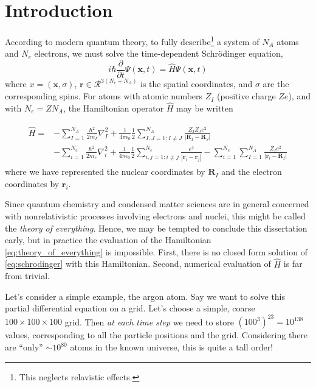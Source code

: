 \chapter{Introduction}
\label{chap:intro}

According to modern quantum theory, to fully describe\footnote{This neglects relavistic effects.} a system of $N_A$ atoms and $N_e$ electrons, we must solve the time-dependent Schr\"odinger equation,
\begin{equation}
    \label{eq:schrodinger}
    i \hbar \frac{\partial}{\partial t} \Psi(\bm{x}, t)
    = \hat{H} \Psi(\bm{x}, t)
\end{equation}
where $x=(\bm{x}, \sigma)$, $\bm r\in\mathcal{R}^{3(N_e+N_A)}$ is the spatial coordinates, and $\sigma$ are the corresponding spins. For atoms with atomic numbers $Z_I$ (positive charge $Ze$), and with $N_e=ZN_A$, the Hamiltonian operator $\hat H$ may be written

\begin{align}
\begin{split}
\label{eq:theory_of_everything}
\hat H =& -\sum_{I=1}^{N_A}\frac{\hbar^2}{2m_I} \nabla^2_I
+ \frac 1{4\pi\epsilon_0} \frac 12\sum_{I,J=1;I\neq J}^{N_A} \frac{Z_IZ_Je^2}{|\bm R_I-\bm R_J|} \\
&- \sum_{i=1}^{N_e} \frac{\hbar^2}{2m_e} \nabla^2_i
+ \frac 1{4\pi\epsilon_0} \frac 12\sum_{i,j=1;i\neq j}^{N_e} \frac{e^2}{|\bm r_i-\bm r_j|}
- \sum_{i=1}^{N_e} \sum_{I=1}^{N_A} \frac{Z_I e^2}{|\bm r_i-\bm R_I|}
\end{split}
\end{align}
where we have represented the nuclear coordinates by $\bm R_I$ and the electron coordinates by $\bm r_i$.

Since quantum chemistry and condensed matter sciences are in general concerned with nonrelativistic processes involving electrons and nuclei, this might be called the \emph{theory of everything}. Hence, we may be tempted to conclude this dissertation early, but in practice the evaluation of the Hamiltonian \eqref{eq:theory_of_everything} is impossible. First, there is no closed form solution of \eqref{eq:schrodinger} with this Hamiltonian. Second, numerical evaluation of $\hat H$ is far from trivial.

Let's consider a simple example, the argon atom. Say we want to solve this partial differential equation on a grid. Let's choose a simple, coarse $100\times 100\times 100$ grid. Then \emph{at each time step} we need to store $(100^3)^{23}=10^{138}$ values, corresponding to all the particle positions and the grid. Considering there are ``only'' $\sim 10^{80}$ atoms in the known universe, this is quite a tall order!

